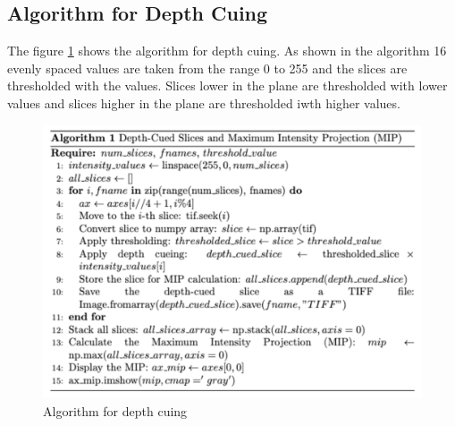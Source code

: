 \documentclass{article}
\begin{document}
\subsection*{Algorithm for Depth Cuing}
The figure \ref{fig:depth-cuing} shows the algorithm for depth cuing. As shown in the algorithm 16 evenly spaced values are taken from the range 0 to 255 and the slices are thresholded with the values. Slices lower in the plane are thresholded with lower values and slices higher in the plane are thresholded iwth higher values. %
\begin{figure}
    \centering
    \includegraphics[width=0.5\linewidth]{Report/Images/depth_cuing.png}
    \caption{Algorithm for depth cuing }
    \label{fig:depth-cuing}
\end{figure}
\end{document}
